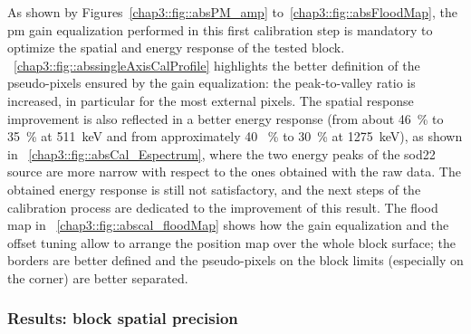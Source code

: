As shown by Figures~\ref{chap3::fig::absPM_amp} to~\ref{chap3::fig::absFloodMap}, the \gls{pm} gain equalization performed in this first calibration step is mandatory to optimize the spatial and energy response of the tested block. \figurename~\ref{chap3::fig::abssingleAxisCalProfile} highlights the better definition of the pseudo-pixels ensured by the gain equalization: the peak-to-valley ratio is increased, in particular for the most external pixels. The spatial response improvement is also reflected in a better energy response (from about 46~\% to 35~\% at 511~keV and from approximately 40 ~\% to 30~\% at 1275~keV), as shown in \figurename~\ref{chap3::fig::absCal_Espectrum}, where the two energy peaks of the \gls{sod22} source are more narrow with respect to the ones obtained with the raw data. The obtained energy response is still not satisfactory, and the next steps of the calibration process are dedicated to the improvement of this result. The flood map in \figurename~\ref{chap3::fig::abscal_floodMap} shows how the gain equalization and the offset tuning allow to arrange the position map over the whole block surface; the borders are better defined and the pseudo-pixels on the block limits (especially on the corner) are better separated. 


\subsubsection{Results: block spatial precision}\label{chap3::subsubsec::absBlockSpatialAcc}

